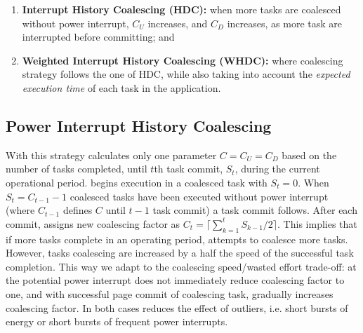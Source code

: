 \begin{enumerate}
	\item \textbf{Interrupt History Coalescing (HDC):} when more tasks are coalesced without power interrupt, $C_U$ increases, and $C_D$ increases, as more task are interrupted before committing; and 
	\item \textbf{Weighted Interrupt History Coalescing (WHDC):} where coalescing strategy follows the one of HDC, while also taking into account the \emph{expected execution time} of each task in the application.
\end{enumerate}

\subsection{Power Interrupt History Coalescing}

With this strategy \sys calculates only one parameter $C=C_U=C_D$ based on the number of tasks completed, until $t$th task commit, $S_t$, during the current operational period. \sys begins execution in a coalesced task with $S_t=0$. When $S_t=C_{t-1}-1$ coalesced tasks have been executed without power interrupt (where $C_{t-1}$ defines $C$ until $t-1$ task commit) a task commit follows. After each commit, \sys assigns new coalescing factor as $C_{t}=\lceil \sum_{k=1}^{t}S_{k-1}/2\rceil$. This implies that if more tasks complete in an operating period, \sys attempts to coalesce more tasks. However, tasks coalescing are increased by a half the speed of the successful task completion. This way we adapt to the coalescing speed/wasted effort trade-off: at the potential power interrupt \sys does not immediately reduce coalescing factor to one, and with successful page commit of coalescing task, \sys gradually increases coalescing factor. In both cases \sys reduces the effect of outliers, i.e. short bursts of energy or short bursts of frequent power interrupts.


